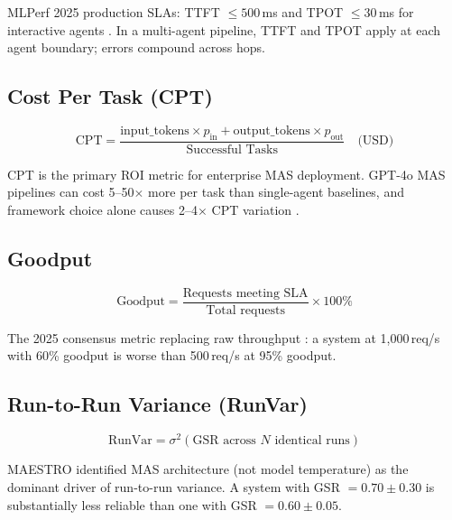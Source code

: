 \documentclass[11pt,a4paper]{article}
\begin{document}
MLPerf 2025 production SLAs: TTFT $\leq 500$\,ms and TPOT $\leq 30$\,ms for
interactive agents \citep{nvidia_nim2025}. In a multi-agent pipeline, TTFT and TPOT
apply at each agent boundary; errors compound across hops.

\subsection{Cost Per Task (CPT)}

\begin{equation}
  \text{CPT} = \frac{\text{input\_tokens} \times p_{\text{in}} +
                     \text{output\_tokens} \times p_{\text{out}}}
                    {\text{Successful Tasks}} \quad\text{(USD)}
\end{equation}

CPT is the primary ROI metric for enterprise MAS deployment. GPT-4o MAS pipelines
can cost 5--50$\times$ more per task than single-agent baselines, and framework choice
alone causes 2--4$\times$ CPT variation \citep{galileo_benchmarks2025}.

\subsection{Goodput}

\begin{equation}
  \text{Goodput} = \frac{\text{Requests meeting SLA}}{\text{Total requests}} \times 100\%
\end{equation}

The 2025 consensus metric replacing raw throughput \citep{databricks_inference2025}:
a system at 1,000\,req/s with 60\% goodput is worse than 500\,req/s at 95\% goodput.

\subsection{Run-to-Run Variance (RunVar)}

\begin{equation}
  \text{RunVar} = \sigma^2(\text{GSR across } N \text{ identical runs})
\end{equation}

MAESTRO \citep{maestro2025} identified MAS architecture (not model temperature) as the
dominant driver of run-to-run variance. A system with GSR $= 0.70 \pm 0.30$ is
substantially less reliable than one with GSR $= 0.60 \pm 0.05$.

\end{document}
